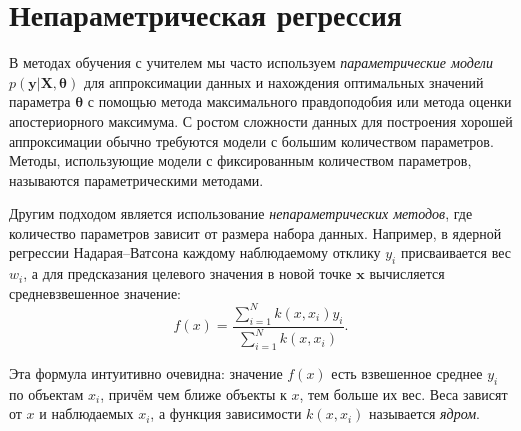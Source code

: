 \documentclass[11pt,a4paper]{article}
\begin{document}
    \hypertarget{ux43dux435ux43fux430ux440ux430ux43cux435ux442ux440ux438ux447ux435ux441ux43aux430ux44f-ux440ux435ux433ux440ux435ux441ux441ux438ux44f}{%
\section{Непараметрическая
регрессия}\label{ux43dux435ux43fux430ux440ux430ux43cux435ux442ux440ux438ux447ux435ux441ux43aux430ux44f-ux440ux435ux433ux440ux435ux441ux441ux438ux44f}}

    В методах обучения с учителем мы часто используем \emph{параметрические
модели} \(p(\mathbf{y} \lvert \mathbf{X},\boldsymbol\theta)\) для
аппроксимации данных и нахождения оптимальных значений параметра
\(\boldsymbol\theta\) с помощью метода максимального правдоподобия или
метода оценки апостериорного максимума. С ростом сложности данных для
построения хорошей аппроксимации обычно требуются модели с большим
количеством параметров. Методы, использующие модели с фиксированным
количеством параметров, называются параметрическими методами.

    Другим подходом является использование \emph{непараметрических методов},
где количество параметров зависит от размера набора данных. Например, в
ядерной регрессии Надарая--Ватсона каждому наблюдаемому отклику \(y_i\)
присваивается вес \(w_i\), а для предсказания целевого значения в новой
точке \(\mathbf{x}\) вычисляется средневзвешенное значение: \[
  f(x) = \frac{\sum_{i=1}^{N} k(x, x_i) y_i} {\sum_{i=1}^{N} k(x, x_i)}.
\]

Эта формула интуитивно очевидна: значение \(f(x)\) есть взвешенное
среднее \(y_i\) по объектам \(x_i\), причём чем ближе объекты к \(x\),
тем больше их вес. Веса зависят от \(x\) и наблюдаемых \(x_i\), а
функция зависимости \(k(x, x_i)\) называется \emph{ядром}.
\end{document}
